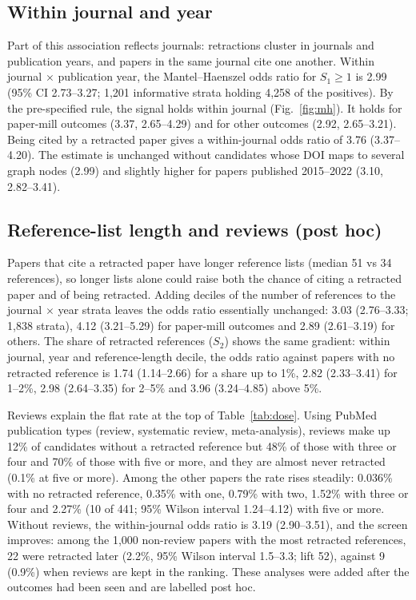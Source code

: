 \subsection{Within journal and year}
Part of this association reflects journals: retractions cluster in journals and publication years, and papers in the
same journal cite one another. Within journal $\times$ publication year, the Mantel--Haenszel odds ratio for
$S_1 \ge 1$ is 2.99 (95\% CI 2.73--3.27; 1,201 informative strata holding 4,258 of the positives). By the
pre-specified rule, the signal holds within journal (Fig.~\ref{fig:mh}). It holds for paper-mill outcomes (3.37, 2.65--4.29) and for
other outcomes (2.92, 2.65--3.21). Being cited by a retracted paper gives a within-journal odds ratio of 3.76
(3.37--4.20). The estimate is unchanged without candidates whose DOI maps to several graph nodes (2.99) and slightly
higher for papers published 2015--2022 (3.10, 2.82--3.41).

\subsection{Reference-list length and reviews (post hoc)}
Papers that cite a retracted paper have longer reference lists (median 51 vs 34 references), so longer lists alone
could raise both the chance of citing a retracted paper and of being retracted. Adding deciles of the number of
references to the journal $\times$ year strata leaves the odds ratio essentially unchanged: 3.03 (2.76--3.33; 1,838
strata), 4.12 (3.21--5.29) for paper-mill outcomes and 2.89 (2.61--3.19) for others. The share of retracted references
($S_2$) shows the same gradient: within journal, year and reference-length decile, the odds ratio against papers
with no retracted reference is 1.74 (1.14--2.66) for a share up to 1\%, 2.82 (2.33--3.41) for 1--2\%, 2.98
(2.64--3.35) for 2--5\% and 3.96 (3.24--4.85) above 5\%.

Reviews explain the flat rate at the top of Table~\ref{tab:dose}. Using PubMed publication types (review, systematic
review, meta-analysis), reviews make up 12\% of candidates without a retracted reference but 48\% of those with three
or four and 70\% of those with five or more, and they are almost never retracted (0.1\% at five or more). Among the
other papers the rate rises steadily: 0.036\% with no retracted reference, 0.35\% with one, 0.79\% with two,
1.52\% with three or four and 2.27\% (10 of 441; 95\% Wilson interval 1.24--4.12) with five or more. Without reviews, the within-journal odds ratio is
3.19 (2.90--3.51), and the screen improves: among the 1,000 non-review papers with the most retracted references, 22
were retracted later (2.2\%, 95\% Wilson interval 1.5--3.3; lift 52), against 9 (0.9\%) when reviews are kept in
the ranking. These analyses were added after the outcomes had been seen and are labelled post hoc.

